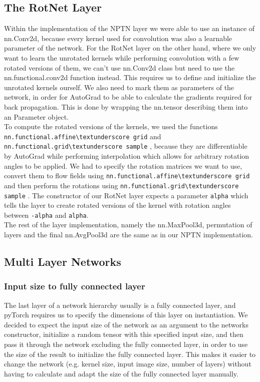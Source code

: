 \documentclass{llncs}
\begin{document}
\subsection{The RotNet Layer}
\newcommand{\nnaffinegrid}{\nolinkurl{nn.functional.affine\textunderscore grid} }
\newcommand{\nngridsample}{\nolinkurl{nn.functional.grid\textunderscore sample} }
Within the implementation of the NPTN layer we were able to use an instance of nn.Conv2d, because every kernel used for convolution was also a learnable parameter of the network.
For the RotNet layer on the other hand, where we only want to learn the unrotated kernels while performing convolution with a few rotated versions of them, we can't use nn.Conv2d class but need to use the nn.functional.conv2d function instead.
This requires us to define and initialize the unrotated kernels ourself. We also need to mark them as parameters of the network, in order for AutoGrad to be able to calculate the gradients required for back propagation. This is done by wrapping the nn.tensor describing them into an Parameter object.\\
To compute the rotated versions of the kernels, we used the functions \nnaffinegrid and \nngridsample, because they are differentiable by AutoGrad while performing interpolation which allows for arbitrary rotation angles to be applied. We had to specify the rotation matrices we want to use, convert them to flow fields using \nnaffinegrid and then perform the rotations using \nngridsample. The constructor of our RotNet layer expects a parameter \nolinkurl{alpha} which tells the layer to create rotated versions of the kernel with rotation angles between \nolinkurl{-alpha} and \nolinkurl{alpha}.\\
The rest of the layer implementation, namely the nn.MaxPool3d, permutation of layers and the final nn.AvgPool3d are the same as in our NPTN implementation.

\subsection{Multi Layer Networks}


\subsubsection{Input size to fully connected layer}
The last layer of a network hierarchy usually is a fully connected layer, and pyTorch requires us to specify the dimensions of this layer on instantiation. We decided to expect the input size of the network as an argument to the networks constructor, initialize a random tensor with this specified input size, and then pass it through the network excluding the fully connected layer, in order to use the size of the result to initialize the fully connected layer. This makes it easier to change the network (e.g. kernel size, input image size, number of layers) without having to calculate and adapt the size of the fully connected layer manually. 
\end{document}
